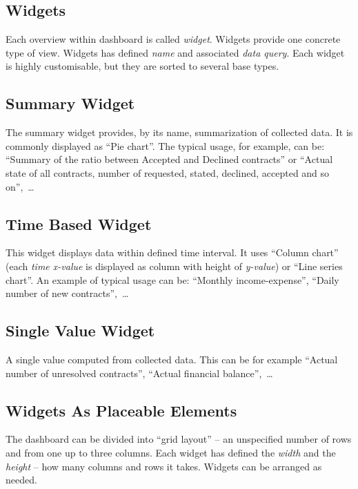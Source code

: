 \subsection{Widgets}
Each overview within dashboard is called \textit{widget}. Widgets provide one concrete type of view. Widgets has defined \textit{name} and associated \textit{data query}. Each widget is highly customisable, but they are sorted to several base types.
\subsection{Summary Widget}
The summary widget provides, by its name, summarization of collected data. It is commonly displayed as ``Pie chart''. The typical usage, for example, can be: ``Summary of the ratio between Accepted and Declined contracts'' or ``Actual state of all contracts, number of requested, stated, declined, accepted and so on'',~\dots
\subsection{Time Based Widget}
This widget displays data within defined time interval. It uses ``Column chart''  (each \textit{time x-value} is displayed as column with height of \textit{y-value}) or ``Line series chart''. An example of typical usage can be: ``Monthly income-expense'', ``Daily number of new contracts'',~\dots
\subsection{Single Value Widget}
A single value computed from collected data. This can be for example ``Actual number of unresolved contracts'', ``Actual financial balance'',~\dots 
\subsection{Widgets As Placeable Elements}
The dashboard can be divided into ``grid layout'' -- an unspecified number of rows and from one up to three columns. Each widget has defined the \textit{width} and the \textit{height} -- how many columns and rows it takes. Widgets can be arranged as needed. 

